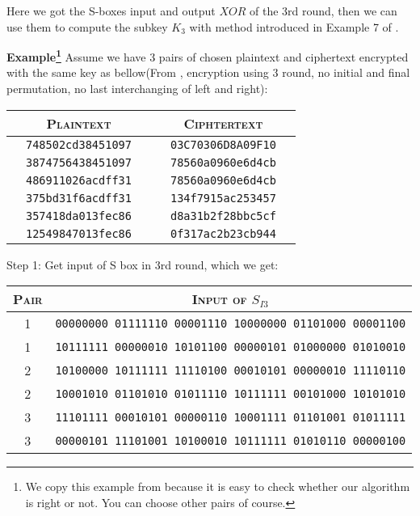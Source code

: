 \documentclass[a4paper,10pt]{article}
\begin{document}
Here we got the S-boxes input and output $XOR$ of the 3rd round, then we can use them to compute the subkey $K_3$ with method introduced in Example 7 of \cite{BIHA91}.

\noindent\textbf{Example\footnote{We copy this example from \cite{FENG00} because it is easy to check whether our algorithm is right or not. You can choose other pairs of course.}} Assume we have 3 pairs of chosen plaintext and ciphertext encrypted with the same key as bellow(From \cite{FENG00}, encryption using 3 round, no initial and final permutation, no last interchanging of left and right):

\begin{center}\begin{longtable}{p{1cm}cp{1cm}|p{1cm}cp{1cm}}
\hline
 &\textsc{Plaintext}& & &\textsc{Ciphtertext}&\\
\hline
 &\texttt{748502cd38451097}& & &\texttt{03C70306D8A09F10}&\\
 &\texttt{3874756438451097}& & &\texttt{78560a0960e6d4cb}&\\
\hline
 &\texttt{486911026acdff31}& & &\texttt{78560a0960e6d4cb}&\\
 &\texttt{375bd31f6acdff31}& & &\texttt{134f7915ac253457}&\\
\hline
 &\texttt{357418da013fec86}& & &\texttt{d8a31b2f28bbc5cf}&\\
 &\texttt{12549847013fec86}& & &\texttt{0f317ac2b23cb944}&\\
\hline
\end{longtable}\end{center}

\noindent\textsf{Step 1:} Get input of S box in 3rd round, which we get:

\begin{center}\begin{longtable}{c|c}
\hline
\textsc{Pair} & \textsc{Input of $S_{I3}$}\\
\hline
1&\texttt{00000000 01111110 00001110 10000000 01101000 00001100}\\
1&\texttt{10111111 00000010 10101100 00000101 01000000 01010010}\\
\hline
2&\texttt{10100000 10111111 11110100 00010101 00000010 11110110}\\
2&\texttt{10001010 01101010 01011110 10111111 00101000 10101010}\\
\hline
3&\texttt{11101111 00010101 00000110 10001111 01101001 01011111}\\
3&\texttt{00000101 11101001 10100010 10111111 01010110 00000100}\\
\hline
\end{longtable}\end{center}
\end{document}
